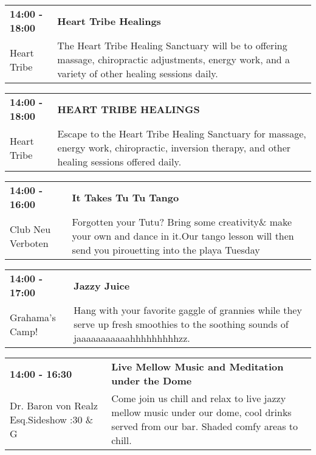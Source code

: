\begin{tabular}{ p{1in} p{2.2in} }
    \textbf{14:00 - 18:00} & \textbf{Heart Tribe Healings} \\
    Heart Tribe \newline  & The Heart Tribe Healing Sanctuary will be to offering massage, chiropractic adjustments, energy work, and a variety of other healing sessions daily. \\
    \hline 
\end{tabular}
    
\begin{tabular}{ p{1in} p{2.2in} }
    \textbf{14:00 - 18:00} & \textbf{HEART TRIBE HEALINGS} \\
    Heart Tribe \newline  & Escape to the Heart Tribe Healing Sanctuary for massage, energy work, chiropractic, inversion therapy, and other healing sessions offered daily. \\
    \hline 
\end{tabular}
    
\begin{tabular}{ p{1in} p{2.2in} }
    \textbf{14:00 - 16:00} & \textbf{It Takes Tu Tu Tango  } \\
    Club Neu Verboten \newline  & Forgotten your Tutu? Bring some creativity\& make your own and dance in it.Our tango lesson will then send you pirouetting into the playa Tuesday \\
    \hline 
\end{tabular}
    
\begin{tabular}{ p{1in} p{2.2in} }
    \textbf{14:00 - 17:00} & \textbf{Jazzy Juice} \\
    Grahama's Camp! \newline  & Hang with your favorite gaggle of grannies while they serve up fresh smoothies to the soothing sounds of jaaaaaaaaaaahhhhhhhhhzz. \\
    \hline 
\end{tabular}
    
\begin{tabular}{ p{1in} p{2.2in} }
    \textbf{14:00 - 16:30} & \textbf{Live Mellow Music and Meditation under the Dome} \\
    Dr. Baron von Realz Esq.Sideshow \newline 4:30 \&  G & Come join us chill and relax to live jazzy mellow music under our dome, cool drinks served from our bar. Shaded comfy areas to chill. \\
    \hline 
\end{tabular}
    

